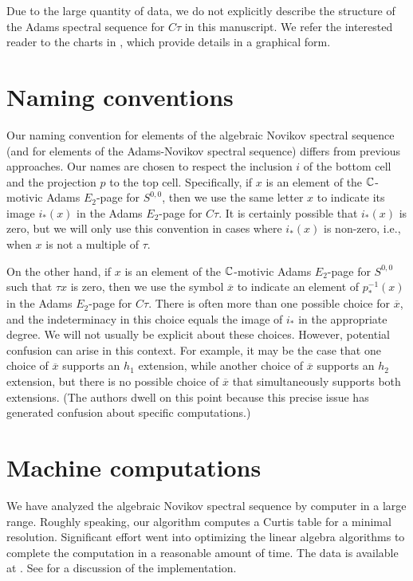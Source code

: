 Due to the large quantity of data, we do not explicitly 
describe the structure of the Adams spectral sequence
for $C\tau$ in this manuscript.  We refer the interested
reader to the charts in \cite{IWX19}, which provide details
in a graphical form.

\section{Naming conventions}
\label{sctn:Ctau-naming}

Our naming convention for elements of the algebraic Novikov
spectral sequence (and for elements of the Adams-Novikov
spectral sequence) differs from previous approaches.
Our names are chosen to respect the inclusion $i$ of the
bottom cell and the projection $p$ to the top cell.
Specifically, if $x$ is an element of the
$\mathbb{C}$-motivic Adams $E_2$-page for $S^{0,0}$, then we use the same
letter $x$ to indicate its image 
$i_*(x)$ in the Adams $E_2$-page for $C\tau$.
It is certainly possible that $i_*(x)$ is zero, but
we will only use this convention in cases where 
$i_*(x)$ is non-zero, i.e., when $x$ is not a multiple of $\tau$.

On the other hand, if $x$ is an element of the $\mathbb{C}$-motivic
Adams $E_2$-page for $S^{0,0}$ such that $\tau x$ is zero,
then we use the symbol $\overline{x}$ to indicate an element
of $p_*^{-1} (x)$ in the Adams $E_2$-page for $C\tau$.
There is often more than one possible choice for $\overline{x}$,
and the indeterminacy in this choice equals the image of
$i_*$ in the appropriate degree.  We will not usually be explicit
about these choices.  However, potential confusion can arise
in this context.  For example, it may be the case that
one choice of $\overline{x}$ supports an $h_1$ extension,
while another choice of $\overline{x}$ supports an $h_2$ extension,
but there is no possible choice of $\overline{x}$ that simultaneously
supports both extensions.  (The authors dwell on this point
because this precise issue has generated confusion about specific
computations.)

\section{Machine computations}
\label{sctn:AANNSS-machine}

We have analyzed the algebraic Novikov spectral sequence
by computer in a large range.  Roughly speaking, our algorithm
computes a Curtis table for a minimal resolution. 
Significant effort went into optimizing the linear algebra
algorithms to complete the computation in a reasonable amount of time.
The data is available at \cite{IWX19}.
See \cite{Wang20} for a discussion of the implementation.

